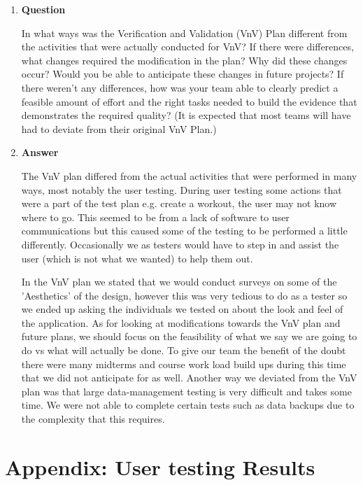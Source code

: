 \documentclass[12pt, titlepage]{article}
\begin{document}
\begin{enumerate}
	\item \textbf{Question} 
	
	In what ways was the Verification and Validation (VnV) Plan different
	from the activities that were actually conducted for VnV?  If there were
	differences, what changes required the modification in the plan?  Why did
	these changes occur?  Would you be able to anticipate these changes in future
	projects?  If there weren't any differences, how was your team able to clearly
	predict a feasible amount of effort and the right tasks needed to build the
	evidence that demonstrates the required quality?  (It is expected that most
	teams will have had to deviate from their original VnV Plan.)
	
	\item \textbf{Answer}
	
	The VnV plan differed from the actual activities that were performed in many ways, most notably the user testing. During user testing some actions that were a part of the test plan e.g. create a workout, the user may not know where to go. This seemed to be from a lack of software to user communications but this caused some of the testing to be performed a little differently. Occasionally we as testers would have to step in and assist the user (which is not what we wanted) to help them out.
	 
	In the VnV plan we stated that we would conduct surveys on some of the 'Aesthetics' of the design, however this was very tedious to do as a tester so we ended up asking the individuals we tested on about the look and feel of the application. As for looking at modifications towards the VnV plan and future plans, we should focus on the feasibility of what we say we are going to do vs what will actually be done. To give our team the benefit of the doubt there were many midterms and course work load build ups during this time that we did not anticipate for as well. Another way we deviated from the VnV plan was that large data-management testing is very difficult and takes some time. We were not able to complete certain tests such as data backups due to the complexity that this requires. 
\end{enumerate}

\newpage{}
\section{Appendix: User testing Results}
\end{document}
